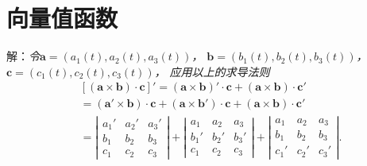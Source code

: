 \section{向量值函数}

\begin{frame}
	\linespread{1.5}
\end{frame}

\begin{frame}
	\linespread{1.5}
	
	\small 解：\it 令$\bm{a}=(a_1(t), a_2(t), a_3(t))$，
	$\bm{b}=(b_1(t), b_2(t), b_3(t))$，$\bm{c}=(c_1(t), c_2(t), c_3(t))$，
	应用以上的求导法则
	\begin{align*}
		&[(\bm{a}\times\bm{b})\cdot\bm{c}]'
		=(\bm{a}\times\bm{b})'\cdot\bm{c}+(\bm{a}\times\bm{b})\cdot\bm{c}'\\
		&=(\bm{a}'\times\bm{b})\cdot\bm{c}+(\bm{a}\times\bm{b}')\cdot\bm{c}
		+(\bm{a}\times\bm{b})\cdot\bm{c}'\\
		&=\left|\begin{array}{ccc}
  	a_1' & a_2' & a_3'\\
  	b_1 & b_2 & b_3\\
  	c_1 & c_2 & c_3
  \end{array}\right|
  +\left|\begin{array}{ccc}
  	a_1 & a_2 & a_3\\
  	b_1' & b_2' & b_3'\\
  	c_1 & c_2 & c_3
  \end{array}\right|
  +\left|\begin{array}{ccc}
  	a_1 & a_2 & a_3\\
  	b_1 & b_2 & b_3\\
  	c_1' & c_2' & c_3'
  \end{array}\right|.
	\end{align*}
	\fin
\end{frame}

